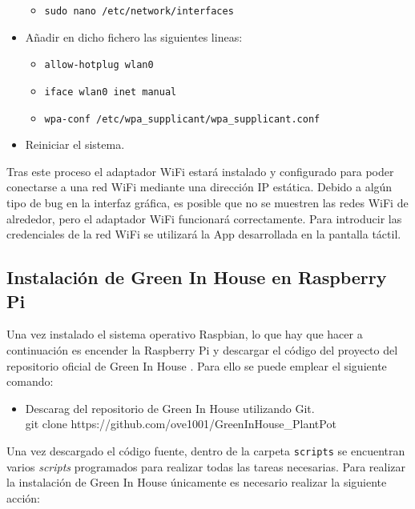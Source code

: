 \begin{itemize}
            \begin{itemize}
                \item \texttt{sudo nano /etc/network/interfaces}
            \end{itemize}
        \item Añadir en dicho fichero las siguientes lineas:
            \begin{itemize}
                \item \texttt{allow-hotplug wlan0}
                \item \texttt{iface wlan0 inet manual}
                \item \texttt{wpa-conf /etc/wpa\_supplicant/wpa\_supplicant.conf}
            \end{itemize}
        \item Reiniciar el sistema.
    \end{itemize}
    Tras este proceso el adaptador WiFi estará instalado y configurado para poder conectarse a una red WiFi mediante una dirección IP estática. Debido a algún tipo de bug en la interfaz gráfica, es posible que no se muestren las redes WiFi de alrededor, pero el adaptador WiFi funcionará correctamente. Para introducir las credenciales de la red WiFi se utilizará la App desarrollada en la pantalla táctil.

    \subsection{Instalación de Green In House en Raspberry Pi}
    Una vez instalado el sistema operativo Raspbian, lo que hay que hacer a continuación es encender la Raspberry Pi y descargar el código del proyecto del repositorio oficial de Green In House \cite{GreenInHouse:repo:Maceta}. Para ello se puede emplear el siguiente comando:

    \begin{itemize}
        \item Descarag del repositorio de Green In House utilizando Git.
        \\ git clone https://github.com/ove1001/GreenInHouse\_PlantPot
    \end{itemize}
    
    Una vez descargado el código fuente, dentro de la carpeta \texttt{scripts} se encuentran varios \textit{scripts} programados para realizar todas las tareas necesarias. Para realizar la instalación de Green In House únicamente es necesario realizar la siguiente acción:

